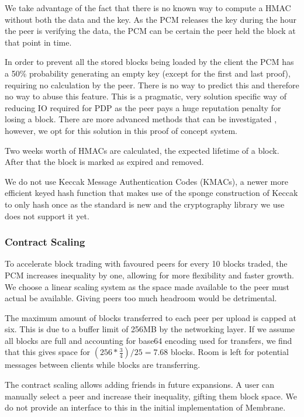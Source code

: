 \documentclass[11pt, a4paper, twocolumn, twoside]{report}
\begin{document}
We take advantage of the fact that there is no known way to compute a HMAC without both the data and the key. As the PCM releases the key during the hour the peer is verifying the data, the PCM can be certain the peer held the block at that point in time. \citep{ateniese2011remote}

In order to prevent all the stored blocks being loaded by the client the PCM has a 50\% probability generating an empty key (except for the first and last proof), requiring no calculation by the peer. There is no way to predict this and therefore no way to abuse this feature. This is a pragmatic, very solution specific way of reducing IO required for PDP as the peer pays a huge reputation penalty for losing a block. There are more advanced methods that can be investigated \citep*{ateniese2011remote, shacham2008compact, bowers2009proofs}, however, we opt for this solution in this proof of concept system.

Two weeks worth of HMACs are calculated, the expected lifetime of a block. After that the block is marked as expired and removed.

We do not use Keccak Message Authentication Codes (KMACs), a newer more efficient keyed hash function that makes use of the sponge construction of Keccak to only hash once \citep{kelsey2016sha} as the standard is new and the cryptography library we use does not support it yet.

\subsubsection{Contract Scaling}

To accelerate block trading with favoured peers for every 10 blocks traded, the PCM increases inequality by one, allowing for more flexibility and faster growth. We choose a linear scaling system as the space made available to the peer must actual be available. Giving peers too much headroom would be detrimental. 

The maximum amount of blocks transferred to each peer per upload is capped at six. This is due to a buffer limit of 256MB by the networking layer. If we assume all blocks are full and accounting for base64 encoding used for transfers, we find that this gives space for $(256 * \frac{3}{4}) / 25 = 7.68$ blocks. Room is left for potential messages between clients while blocks are transferring.

The contract scaling allows adding friends in future expansions. A user can manually select a peer and increase their inequality, gifting them block space. We do not provide an interface to this in the initial implementation of Membrane.
\end{document}
